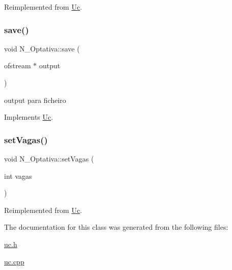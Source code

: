 Reimplemented from \hyperlink{class_uc_aabb7272709731972c4bc574cfde28772}{Uc}.

\hypertarget{class_n___optativa_aeb26db4a13ec5c11afa10b7e39bba66d}{}\label{class_n___optativa_aeb26db4a13ec5c11afa10b7e39bba66d} 
\subsubsection{\texorpdfstring{save()}{save()}}
{\footnotesize\ttfamily void N\+\_\+\+Optativa\+::save (\begin{DoxyParamCaption}\item[{ofstream $\ast$}]{output }\end{DoxyParamCaption})\hspace{0.3cm}{\ttfamily [virtual]}}

output para ficheiro 

Implements \hyperlink{class_uc_a6d5fafb63b88b75408dab0911276ce3f}{Uc}.

\hypertarget{class_n___optativa_a07d95cc8ffddb4e5b6109dceb4647d0c}{}\label{class_n___optativa_a07d95cc8ffddb4e5b6109dceb4647d0c} 
\subsubsection{\texorpdfstring{set\+Vagas()}{setVagas()}}
{\footnotesize\ttfamily void N\+\_\+\+Optativa\+::set\+Vagas (\begin{DoxyParamCaption}\item[{int}]{vagas }\end{DoxyParamCaption})\hspace{0.3cm}{\ttfamily [virtual]}}



Reimplemented from \hyperlink{class_uc_a41b665e518e252eead3d8425696cddf3}{Uc}.



The documentation for this class was generated from the following files\+:\begin{DoxyCompactItemize}
\item 
\hyperlink{uc_8h}{uc.\+h}\item 
\hyperlink{uc_8cpp}{uc.\+cpp}\end{DoxyCompactItemize}
